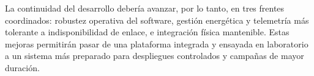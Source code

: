 La continuidad del desarrollo debería avanzar, por lo tanto, en tres frentes coordinados: robustez operativa del software, gestión energética y telemetría más tolerante a indisponibilidad de enlace, e integración física mantenible. Estas mejoras permitirán pasar de una plataforma integrada y ensayada en laboratorio a un sistema más preparado para despliegues controlados y campañas de mayor duración.
